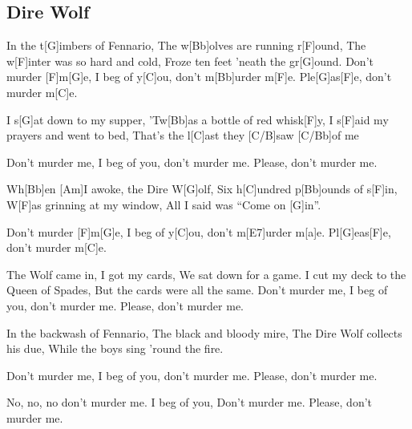 \subsection*{Dire Wolf   }
\begin{guitar}
In the t[G]imbers of Fennario,
The w[Bb]olves are running r[F]ound,
The w[F]inter was so hard and cold,
Froze ten feet 'neath the gr[G]ound.
Don't murder [F]m[G]e,
I beg of y[C]ou, don't m[Bb]urder m[F]e.
Ple[G]as[F]e, don't murder m[C]e.



I s[G]at down to my supper,
'Tw[Bb]as a bottle of red whisk[F]y,
I s[F]aid my prayers and went to bed,
That's the l[C]ast they [C/B]saw [C/Bb]of    me\quad[a]{}



Don't murder me,
I beg of you, don't murder me.
Please, don't murder me.



Wh[Bb]en [Am]I awoke, the Dire W[G]olf,
Six h[C]undred p[Bb]ounds of s[F]in,
W[F]as grinning at my window,
All I said was ``Come on [G]in''.



Don't murder [F]m[G]e,
I beg of y[C]ou, don't m[E7]urder m[a]e.
Pl[G]eas[F]e, don't murder m[C]e.



The Wolf came in, I got my cards,
We sat down for a game.
I cut my deck to the Queen of Spades,
But the cards were all the same.
Don't murder me, I beg of you, don't murder me.
Please, don't murder me.



In the backwash of Fennario,
The black and bloody mire,
The Dire Wolf collects his due,
While the boys sing 'round the fire.



Don't murder me,
I beg of you, don't murder me.
Please, don't murder me.



No, no, no don't murder me.
I beg of you, Don't murder me.
Please, don't murder me.
\end{guitar}
